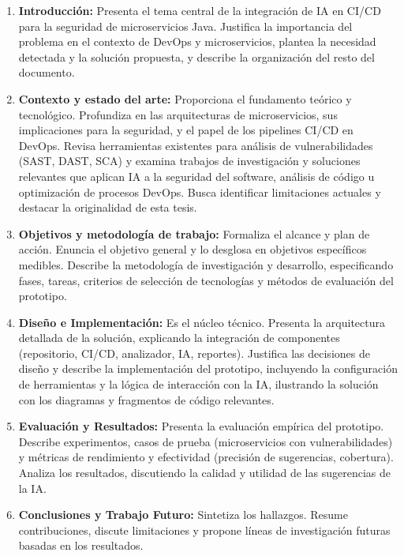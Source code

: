 \begin{enumerate}
\item \textbf{Introducción:} Presenta el tema central de la integración de IA en CI/CD para la seguridad de microservicios Java. Justifica la importancia del problema en el contexto de DevOps y microservicios, plantea la necesidad detectada y la solución propuesta, y describe la organización del resto del documento.

\item \textbf{Contexto y estado del arte:} Proporciona el fundamento teórico y tecnológico. Profundiza en las arquitecturas de microservicios, sus implicaciones para la seguridad, y el papel de los pipelines CI/CD en DevOps. Revisa herramientas existentes para análisis de vulnerabilidades (SAST, DAST, SCA) y examina trabajos de investigación y soluciones relevantes que aplican IA a la seguridad del software, análisis de código u optimización de procesos DevOps. Busca identificar limitaciones actuales y destacar la originalidad de esta tesis.

\item \textbf{Objetivos y metodología de trabajo:} Formaliza el alcance y plan de acción. Enuncia el objetivo general y lo desglosa en objetivos específicos medibles. Describe la metodología de investigación y desarrollo, especificando fases, tareas, criterios de selección de tecnologías y métodos de evaluación del prototipo.

\item \textbf{Diseño e Implementación:} Es el núcleo técnico. Presenta la arquitectura detallada de la solución, explicando la integración de componentes (repositorio, CI/CD, analizador, IA, reportes). Justifica las decisiones de diseño y describe la implementación del prototipo, incluyendo la configuración de herramientas y la lógica de interacción con la IA, ilustrando la solución con los diagramas y fragmentos de código relevantes.

\item \textbf{Evaluación y Resultados:} Presenta la evaluación empírica del prototipo. Describe experimentos, casos de prueba (microservicios con vulnerabilidades) y métricas de rendimiento y efectividad (precisión de sugerencias, cobertura). Analiza los resultados, discutiendo la calidad y utilidad de las sugerencias de la IA.

\item \textbf{Conclusiones y Trabajo Futuro:} Sintetiza los hallazgos. Resume contribuciones, discute limitaciones y propone líneas de investigación futuras basadas en los resultados.
\end{enumerate}

